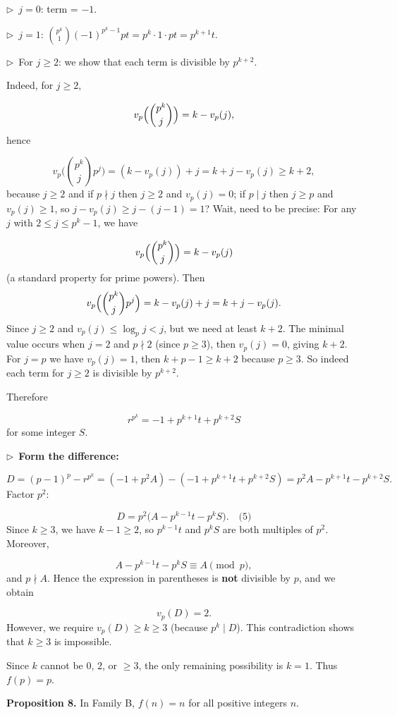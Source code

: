\documentclass{llmxive}
\providecommand{\compactbullet}[1]{\par\noindent$\triangleright$~#1\par}
\begin{document}
\compactbullet{\(j=0\): term = \(-1\).}
\compactbullet{\(j=1\): \(\binom{p^{k}}{1}(-1)^{p^{k}-1}p t = p^{k}\cdot 1\cdot p t = p^{k+1} t\).}
\compactbullet{For \(j\ge2\): we show that each term is divisible by \(p^{k+2}\).}
Indeed, for \(j\ge2\),\par
\[
    v_{p}\Bigl(\binom{p^{k}}{j}\Bigr) = k - v_{p}(j),
    \]
hence\par
\[
    v_{p}\biggl(\binom{p^{k}}{j}p^{j}\biggr) = (k - v_{p}(j)) + j = k + j - v_{p}(j) \ge k+2,
    \]
because \(j\ge2\) and if \(p\nmid j\) then \(j\ge2\) and \(v_{p}(j)=0\); if \(p\mid j\) then \(j\ge p\) and \(v_{p}(j)\ge1\), so \(j - v_{p}(j) \ge j- (j-1) =1\)? Wait, need to be precise: For any \(j\) with \(2\le j\le p^{k}-1\), we have\par
\[
    v_{p}\Bigl(\binom{p^{k}}{j}\Bigr) = k - v_{p}(j)
\]
(a standard property for prime powers). Then
\[
    v_{p}\Bigl(\binom{p^{k}}{j} p^{j}\Bigr) = k - v_{p}(j) + j = k + j - v_{p}(j).
    \]
Since \(j\ge2\) and \(v_{p}(j)\le \log_{p} j < j\), but we need at least \(k+2\). The minimal value occurs when \(j=2\) and \(p\nmid 2\) (since \(p\ge3\)), then \(v_{p}(j)=0\), giving \(k+2\). For \(j=p\) we have \(v_{p}(j)=1\), then \(k + p - 1 \ge k+2\) because \(p\ge3\). So indeed each term for \(j\ge2\) is divisible by \(p^{k+2}\).\par
Therefore\par
\[
  r^{p^{k}} = -1 + p^{k+1} t + p^{k+2} S
  \]
for some integer \(S\).\par
\compactbullet{\textbf{Form the difference:}}
\[
  D = (p-1)^{p} - r^{p^{k}} = (-1 + p^{2} A) - (-1 + p^{k+1} t + p^{k+2} S) = p^{2} A - p^{k+1} t - p^{k+2} S.
  \]
Factor \(p^{2}\):\par
\[
  D = p^{2}\bigl(A - p^{k-1} t - p^{k} S\bigr). \quad\text{(5)}
  \]
Since \(k\ge3\), we have \(k-1\ge2\), so \(p^{k-1} t\) and \(p^{k} S\) are both multiples of \(p^{2}\). Moreover,\par
\[
  A - p^{k-1} t - p^{k} S \equiv A \pmod p,
  \]
and \(p\nmid A\). Hence the expression in parentheses is \textbf{not} divisible by \(p\), and we obtain\par
\[
  v_{p}(D) = 2.
  \]
However, we require \(v_{p}(D) \ge k \ge 3\) (because \(p^{k}\mid D\)). This contradiction shows that \(k\ge3\) is impossible.\par
\smallskip
Since \(k\) cannot be \(0\), \(2\), or \(\ge3\), the only remaining possibility is \(k=1\). Thus \(f(p)=p\).\par
\textbf{Proposition 8.} In Family B, \(f(n)=n\) for all positive integers \(n\).\par
\end{document}
